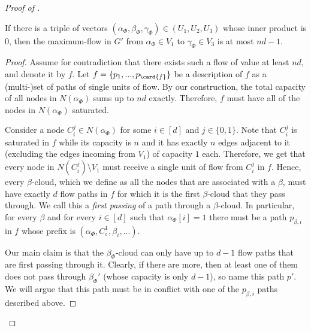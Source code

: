 \begin{proof}[Proof of ]
\begin{claim}
If there is a triple of vectors $(\alpha_{\Phi}, \beta_{\Phi}, \gamma_{\Phi})\in (U_1, U_2, U_3)$ whose inner product is $0$, then the maximum-flow in $G'$ from $\alpha_{\Phi} \in V_1$ to $\gamma_{\Phi} \in V_3$ is at most $nd-1$.
\end{claim}

\begin{proof}
Assume for contradiction that there exists such a flow of value at least $nd$, and denote it by $f$.
Let $f=\{p_1,...,p_{\card{f}}\}$ be a description of $f$ as a (multi-)set of paths of single units of flow.
By our construction, the total capacity of all nodes in $N(\alpha_{\Phi})$ sums up to $nd$ exactly.
Therefore, $f$ must have all of the nodes in $N(\alpha_{\Phi})$ saturated.

Consider a node $C_i^j\in N(\alpha_{\Phi})$ for some $i\in [d]$ and $j\in \{0,1\}$.
Note that $C_i^j$ is saturated in $f$ while its capacity is $n$ and it has exactly $n$ edges adjacent to it (excluding the edges incoming from $V_1$) of capacity $1$ each.
Therefore, we get that every node in $N(C_i^j)\setminus V_1$ must receive a single unit of flow from $C_i^j$ in $f$.
Hence, every $\beta$-cloud, which we define as all the nodes that are associated with a $\beta$, must have exactly $d$ flow paths in $f$ for which it is the first $\beta$-cloud that they pass through. We call this a \textit{first passing} of a path through a $\beta$-cloud.
In particular, for every $\beta$ and for every $i\in [d]$ such that $\alpha_{\Phi}[i]=1$ there must be a path $p_{\beta,i}$ in $f$ whose prefix is $(\alpha_{\Phi}, C_i^1, \beta_i,...)$.

Our main claim is that the $\beta_{\Phi}$-cloud can only have up to $d-1$ flow paths that are first passing through it.
Clearly, if there are more, then at least one of them does not pass through ${\beta_{\Phi}}'$ (whose capacity is only $d-1$), so name this path $p'$.
We will argue that this path must be in conflict with one of the $p_{\beta,i}$ paths described above.


\end{proof}
\end{proof}
